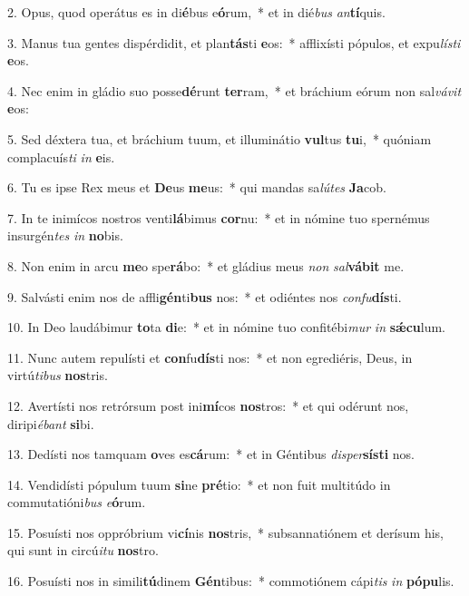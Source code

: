 2. Opus, quod operátus es in di\textbf{é}bus e\textbf{ó}rum,~*  et in dié\textit{bus} \textit{an}\textbf{tí}quis.\

3. Manus tua gentes dispérdidit, et plan\textbf{tás}ti \textbf{e}os:~*  afflixísti pópulos, et expu\textit{lís}\textit{ti} \textbf{e}os.\

4. Nec enim in gládio suo posse\textbf{dé}runt \textbf{ter}ram,~*  et bráchium eórum non sal\textit{vá}\textit{vit} \textbf{e}os:\

5. Sed déxtera tua, et bráchium tuum, et illuminátio \textbf{vul}tus \textbf{tu}i,~*  quóniam complacuís\textit{ti} \textit{in} \textbf{e}is.\

6. Tu es ipse Rex meus et \textbf{De}us \textbf{me}us:~*  qui mandas sa\textit{lú}\textit{tes} \textbf{Ja}cob.\

7. In te inimícos nostros venti\textbf{lá}bimus \textbf{cor}nu:~*  et in nómine tuo spernémus insurgén\textit{tes} \textit{in} \textbf{no}bis.\

8. Non enim in arcu \textbf{me}o spe\textbf{rá}bo:~*  et gládius meus \textit{non} \textit{sal}\textbf{vá}\textbf{bit} me.\

9. Salvásti enim nos de affli\textbf{gén}ti\textbf{bus} nos:~*  et odiéntes nos \textit{con}\textit{fu}\textbf{dís}ti.\

10. In Deo laudábimur \textbf{to}ta \textbf{di}e:~*  et in nómine tuo confitébi\textit{mur} \textit{in} \textbf{sǽ}\textbf{cu}lum.\

11. Nunc autem repulísti et \textbf{con}fu\textbf{dís}ti nos:~*  et non egrediéris, Deus, in virtú\textit{ti}\textit{bus} \textbf{nos}tris.\

12. Avertísti nos retrórsum post ini\textbf{mí}cos \textbf{nos}tros:~*  et qui odérunt nos, diripi\textit{é}\textit{bant} \textbf{si}bi.\

13. Dedísti nos tamquam \textbf{o}ves es\textbf{cá}rum:~*  et in Géntibus \textit{di}\textit{sper}\textbf{sís}\textbf{ti} nos.\

14. Vendidísti pópulum tuum \textbf{si}ne \textbf{pré}tio:~*  et non fuit multitúdo in commutatióni\textit{bus} \textit{e}\textbf{ó}rum.\

15. Posuísti nos oppróbrium vi\textbf{cí}nis \textbf{nos}tris,~*  subsannatiónem et derísum his, qui sunt in circú\textit{i}\textit{tu} \textbf{nos}tro.\

16. Posuísti nos in simili\textbf{tú}dinem \textbf{Gén}tibus:~*  commotiónem cápi\textit{tis} \textit{in} \textbf{pó}\textbf{pu}lis.\

